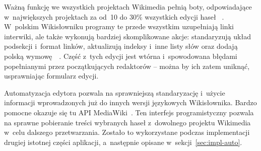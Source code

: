 Ważną funkcję we wszystkich projektach Wikimedia pełnią boty, odpowiadające w~największych projektach za od~10 do 30\% wszystkich edycji haseł ~\cite{bots}. W~polskim Wikisłowniku programy te przede wszystkim uzupełniają linki interwiki, ale także wykonują bardziej skomplikowane akcje: standaryzują układ podsekcji i~format linków, aktualizują indeksy i~inne listy słów oraz dodają polską wymowę~\cite{wikt:boty}~\cite{wikt:olafbot}. Część z~tych edycji jest wtórna i~spowodowana błędami popełnianymi przez początkujących redaktorów -- można by ich zatem uniknąć, usprawniając formularz edycji.

Automatyzacja edytora pozwala na sprawniejszą standaryzację i~użycie informacji wprowadzonych już do innych wersji językowych Wikisłownika. Bardzo pomocne okazuje się tu API MediaWiki~\cite{mw:api}. Ten interfejs programistyczny pozwala na sprawne pobieranie treści wybranych haseł z~dowolnego projektu Wikimedia w~celu dalszego przetwarzania. Zostało to wykorzystane podczas implementacji drugiej istotnej części aplikacji, a~następnie opisane w~sekcji~\ref{sec:impl-auto}.
